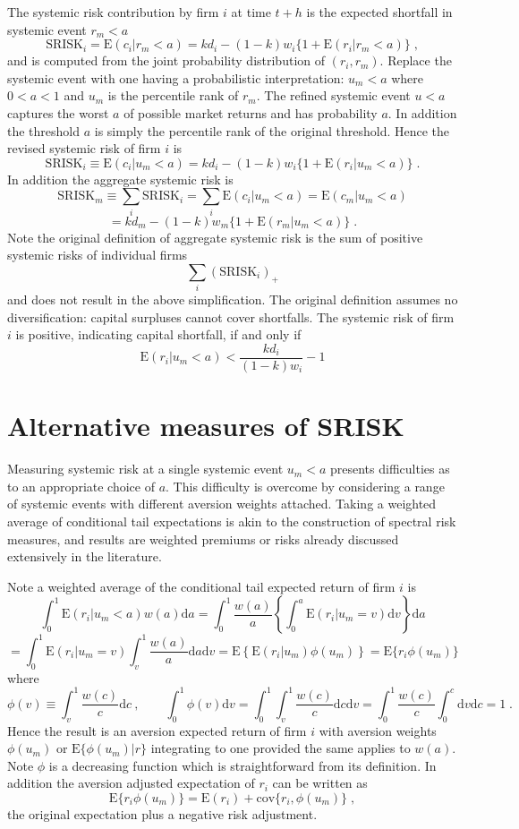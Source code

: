 \documentclass[authoryear]{elsarticle}
\newcommand{\E}{\mathrm{E}}
\newcommand{\cov}{\mathrm{cov}}
\newcommand{\de}{\mathrm{d}}
\newcommand{\cq}{\ , \qquad}
\begin{document}
The systemic risk contribution by firm $i$ at time $t+h$ is the expected shortfall in systemic event $r_m<a$
$$
\mathrm{SRISK}_i = \E(c_i|r_m<a) = kd_i -(1-k)w_i\{1+\E(r_i|r_m<a)\} \;,
$$
and is computed from the joint probability distribution of $(r_i,r_m)$. Replace the systemic event with one having a probabilistic interpretation: $u_m < a$ where $0<a<1$ and $u_m$ is the percentile rank of $r_m$. The refined systemic event $u < a$ captures the worst $a$ of possible market returns and has probability $a$. In addition the threshold $a$ is simply the percentile rank of the original threshold. Hence the revised systemic risk of firm $i$ is
$$
\mathrm{SRISK}_i \equiv \E(c_i|u_m<a) = kd_i -(1-k)w_i\{1+\E(r_i|u_m<a)\} \;.
$$
In addition the aggregate systemic risk is
$$
\mathrm{SRISK}_m \equiv \sum_i \mathrm{SRISK}_i = \sum_i \E(c_i|u_m<a) = \E(c_m|u_m<a)
$$
$$
=kd_m -(1-k)w_m\{1+\E(r_m|u_m<a)\} \;.
$$
Note the original definition of aggregate systemic risk is the sum of positive systemic risks of individual firms
$$
\sum_i \left(\mathrm{SRISK}_i\right)_+
$$
and does not result in the above simplification. The original definition assumes no diversification: capital surpluses cannot cover shortfalls. The systemic risk of firm $i$ is positive, indicating capital shortfall, if and only if
$$
\E(r_i|u_m<a) < \frac{kd_i}{(1-k)w_i} - 1
$$




\section{Alternative measures of SRISK}

Measuring systemic risk at a single systemic event $u_m<a$ presents difficulties as to an appropriate choice of $a$. This difficulty is overcome by considering a range of systemic events with different aversion weights attached. Taking a weighted average of conditional tail expectations is akin to the construction of spectral risk measures, and results are weighted premiums or risks already discussed extensively in the literature.

Note a weighted average of the conditional tail expected return of firm $i$ is
$$
\int_0^1 \E(r_i|u_m<a) w(a) \de a = \int_0^1 \frac{w(a)}{a} \left\{ \int_0^a \E(r_i|u_m=v) \de v \right\}  \de a
$$
$$
=\int_0^1 \E(r_i|u_m=v) \int_v^1  \frac{w(a)}{a}     \de a \de v = \E\left\{\E(r_i|u_m)\phi(u_m)\right\}=\E\{r_i\phi(u_m)\}
$$
where
$$
\phi(v)\equiv \int_v^1 \frac{w(c)}{c}     \de c  
\cq \int_0^1 \phi(v) \de v = \int_0^1 \int_v^1 \frac{w(c)}{c} \de c \de v = \int_0^1 \frac{w(c)}{c} \int_0^c \de v \de c = 1\;.
$$
Hence the result is an aversion expected return of firm $i$ with aversion weights $\phi(u_m)$ or $\E\{\phi(u_m)|r\}$ integrating to one provided the same applies to $w(a)$. Note $\phi$ is a decreasing function which is straightforward from its definition. In addition the aversion adjusted expectation of $r_i$ can be written as
$$
\E\{r_i\phi(u_m)\} = \E(r_i)+\cov\{r_i,\phi(u_m)\} \;,
$$
the original expectation plus a negative risk adjustment.
\end{document}
